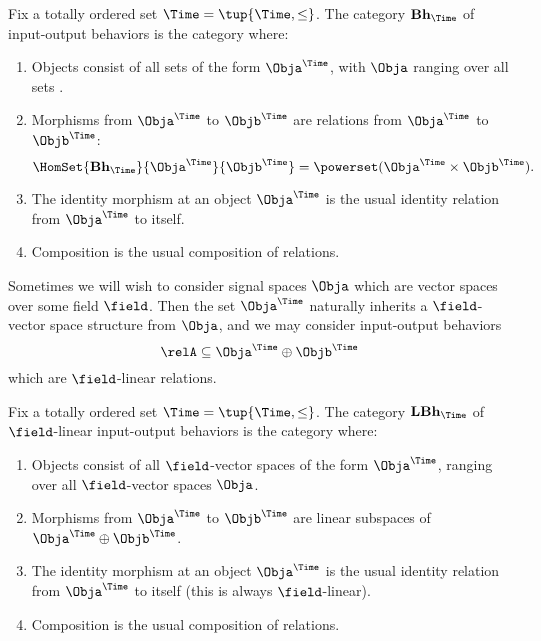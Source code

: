 \begin{definition}
    Fix a totally ordered set $\Time = \tup{\Time, \leq}$.
    The category $\textbf{Bh}_\Time$ of input-output behaviors is the category where:
    \begin{enumerate}
        \item Objects consist of all sets of the form $\Obja^\Time$, with $\Obja$ ranging over all sets .
        \item Morphisms from $\Obja^\Time$ to $\Objb^\Time$ are relations from $\Obja^\Time$ to $\Objb^\Time$:
              \begin{equation}
                  \HomSet{\textbf{Bh}_\Time}{\Obja^\Time}{\Objb^\Time} = \powerset (\Obja^\Time \times \Objb^\Time).
              \end{equation}
        \item The identity morphism at an object $\Obja^\Time$ is the usual identity relation from $\Obja^\Time$ to itself.
        \item Composition is the usual composition of relations.
    \end{enumerate}
\end{definition}

Sometimes we will wish to consider signal spaces $\Obja$ which are vector spaces over some field $\field$.
Then the set $\Obja^\Time$ naturally inherits a $\field$-vector space structure from $\Obja$, and we may consider input-output behaviors
\begin{equation*}
    \relA \subseteq \Obja^\Time \oplus \Objb^\Time
\end{equation*}
which are $\field$-linear relations.

\begin{definition}
    Fix a totally ordered set $\Time = \tup{\Time, \leq}$.
    The category $\textbf{LBh}_\Time$ of $\field$-linear input-output behaviors is the category where:
    \begin{enumerate}
        \item Objects consist of all $\field$-vector spaces of the form $\Obja^\Time$, ranging over all $\field$-vector spaces $\Obja$.
        \item Morphisms from $\Obja^\Time$ to $\Objb^\Time$ are linear subspaces of  $\Obja^\Time \oplus \Objb^\Time$.
        \item The identity morphism at an object $\Obja^\Time$ is the usual identity relation from $\Obja^\Time$ to itself (this is always $\field$-linear).
        \item Composition is the usual composition of relations.
    \end{enumerate}
\end{definition}

